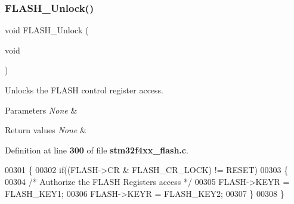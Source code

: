 \subsubsection{F\+L\+A\+S\+H\+\_\+\+Unlock()}
{\footnotesize\ttfamily void F\+L\+A\+S\+H\+\_\+\+Unlock (\begin{DoxyParamCaption}\item[{void}]{ }\end{DoxyParamCaption})}



Unlocks the F\+L\+A\+SH control register access. 


\begin{DoxyParams}{Parameters}
{\em None} & \\
\hline
\end{DoxyParams}

\begin{DoxyRetVals}{Return values}
{\em None} & \\
\hline
\end{DoxyRetVals}


Definition at line \textbf{ 300} of file \textbf{ stm32f4xx\+\_\+flash.\+c}.


\begin{DoxyCode}
00301 \{
00302   \textcolor{keywordflow}{if}((FLASH->CR & FLASH_CR_LOCK) != RESET)
00303   \{
00304     \textcolor{comment}{/* Authorize the FLASH Registers access */}
00305     FLASH->KEYR = FLASH_KEY1;
00306     FLASH->KEYR = FLASH_KEY2;
00307   \}  
00308 \}
\end{DoxyCode}
